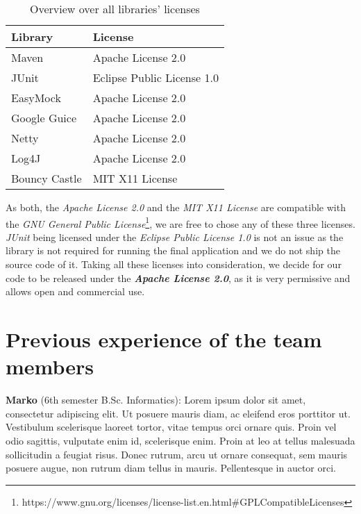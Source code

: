 \documentclass[paper=letter, fontsize=12pt]{article}
\begin{document}
\renewcommand{\arraystretch}{1.5}
\begin{table}[ht]
\centering
\caption{Overview over all libraries' licenses}
\label{tab:licenses}
\begin{tabular}{|l|l|}
\hline
\textbf{Library} & \textbf{License}           \\ \hline
Maven            & Apache License 2.0         \\ \hline
JUnit            & Eclipse Public License 1.0 \\ \hline
EasyMock         & Apache License 2.0         \\ \hline
Google Guice     & Apache License 2.0         \\ \hline
Netty            & Apache License 2.0         \\ \hline
Log4J            & Apache License 2.0         \\ \hline
Bouncy Castle    & MIT X11 License            \\ \hline
\end{tabular}
\end{table}

As both, the \emph{Apache License 2.0} and the \emph{MIT X11 License} are compatible with the \emph{GNU General Public License}\footnote{https://www.gnu.org/licenses/license-list.en.html\#GPLCompatibleLicenses}, we are free to chose any of these three licenses. \emph{JUnit} being licensed under the \emph{Eclipse Public License 1.0} is not an issue as the library is not required for running the final application and we do not ship the source code of it.
Taking all these licenses into consideration, we decide for our code to be released under the \textbf{\emph{Apache License 2.0}}, as it is very permissive and allows open and commercial use.

\section{Previous experience of the team members}
\textbf{Marko} (6th semester B.Sc. Informatics): Lorem ipsum dolor sit amet, consectetur adipiscing elit. Ut posuere mauris diam, ac eleifend eros porttitor ut. Vestibulum scelerisque laoreet tortor, vitae tempus orci ornare quis. Proin vel odio sagittis, vulputate enim id, scelerisque enim. Proin at leo at tellus malesuada sollicitudin a feugiat risus. Donec rutrum, arcu ut ornare consequat, sem mauris posuere augue, non rutrum diam tellus in mauris. Pellentesque in auctor orci. 
\end{document}

